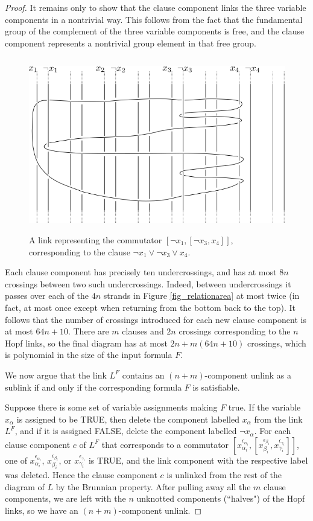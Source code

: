 \documentclass[12pt]{amsart}
\theoremstyle{definition}
\theoremstyle{remark}
\begin{document}
\begin{proof}
It remains only to show that the clause component links the three variable components in a nontrivial way.  This follows from the fact that the fundamental group of the complement of the three variable components is free, and the clause component represents a nontrivial group element in that free group.

\begin{figure}[ht]
\centering
\includegraphics[height=3in]{satclauseexample.png}
\caption{A link representing the commutator $[\neg x_1,[\neg x_3,x_4]]$, corresponding to the clause $ \neg x_1 \vee \neg x_3 \vee x_4$.}
\label{fig_clauselink}
\end{figure}


Each clause component has precisely ten undercrossings, and has at most $8n$ crossings between two such undercrossings. Indeed, between undercrossings it passes over each of the $4n$ strands in Figure \ref{fig_relationarea}  at most twice (in fact, at most once except when returning from the bottom back to the top).  It follows that the number of crossings introduced for each new clause component is at most $64n + 10$.  There are $m$ clauses and $2n$ crossings corresponding to the $n$ Hopf links, so the final diagram has at most $2n+m(64n+10)$ crossings, which is polynomial in the size of the input formula $F$.

We now argue that the link $L^F$ contains an $(n+m)$-component unlink as a sublink if and only if the corresponding formula $F$ is satisfiable.


Suppose there is some set of variable assignments making $F$ true. If the variable $x_\alpha$ is assigned to be TRUE, then delete the component labelled $x_\alpha$ from the link $L^F$, and if it is assigned FALSE, delete the component labelled $\neg x_\alpha$.  For each clause component $c$ of $L^F$ that corresponds to a commutator $[x_{\alpha_i}^{\epsilon_{\alpha_i}}, [ x_{\beta_i}^{\epsilon_{\beta_i}}, x_{\gamma_i}^{\epsilon_{\gamma_i}}]]$, one of $x_{\alpha_i}^{\epsilon_{\alpha_i}}$, $x_{\beta_i}^{\epsilon_{\beta_i}}$, or $x_{\gamma_i}^{\epsilon_{\gamma_i}}$ is TRUE, and the link component with the respective label was deleted. Hence the clause component $c$ is unlinked from the rest of the diagram of $L$ by the Brunnian property. After pulling away all the $m$ clause components, we are left with the $n$ unknotted components (``halves") of the Hopf links, so we have an $(n+m)$-component unlink.


\end{proof}
\end{document}
